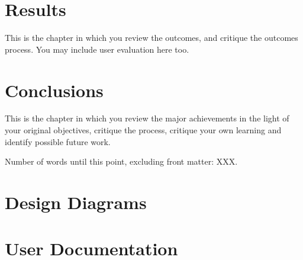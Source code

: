 \documentclass[12pt,a4paper]{report}
\begin{document}
\chapter{Results}

This is the chapter in which you review the outcomes, and critique the outcomes process. You may include user evaluation here too.

\chapter{Conclusions}


This is the chapter in which you review the major achievements in the light of your original objectives, critique the process, critique your own learning and identify possible future work.

\vfill
Number of words until this point, excluding front matter: XXX.



\appendix


\chapter{Design Diagrams}

\chapter{User Documentation}
\end{document}
